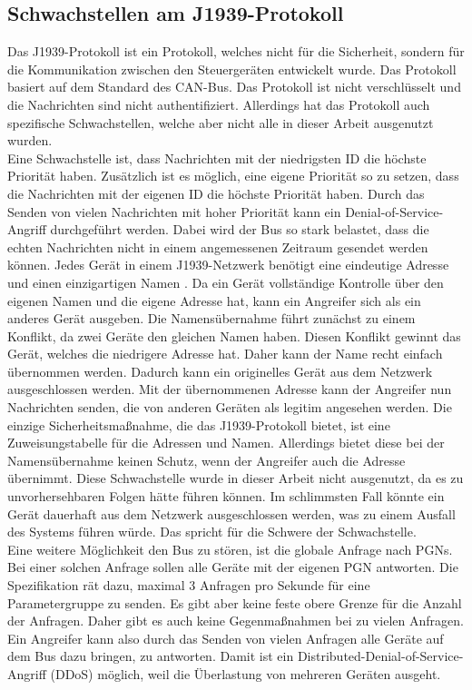 \subsection{Schwachstellen am J1939-Protokoll}
Das J1939-Protokoll ist ein Protokoll, welches nicht für die Sicherheit, sondern für die Kommunikation zwischen den Steuergeräten
entwickelt wurde. Das Protokoll basiert auf dem Standard des CAN-Bus. Das Protokoll ist nicht verschlüsselt und die Nachrichten
sind nicht authentifiziert. 
Allerdings hat das Protokoll auch spezifische Schwachstellen, welche aber nicht alle in dieser Arbeit ausgenutzt wurden.\\
Eine Schwachstelle ist, dass Nachrichten mit der niedrigsten ID die höchste Priorität haben. Zusätzlich ist es möglich, 
eine eigene Priorität so zu setzen, dass die Nachrichten mit der eigenen ID die höchste Priorität haben. Durch das Senden von
vielen Nachrichten mit hoher Priorität kann ein Denial-of-Service-Angriff durchgeführt werden. Dabei wird der Bus so stark belastet,
dass die echten Nachrichten nicht in einem angemessenen Zeitraum gesendet werden können. Jedes Gerät in einem J1939-Netzwerk
benötigt eine eindeutige Adresse und einen einzigartigen Namen \cite{JungerJ1939}. Da ein Gerät vollständige Kontrolle über 
den eigenen Namen und die eigene Adresse hat, kann ein Angreifer sich als ein anderes Gerät ausgeben. Die Namensübernahme führt
zunächst zu einem Konflikt, da zwei Geräte den gleichen Namen haben. Diesen Konflikt gewinnt das Gerät, welches die niedrigere
Adresse hat. Daher kann der Name recht einfach übernommen werden. Dadurch kann ein originelles Gerät aus dem Netzwerk ausgeschlossen
werden. Mit der übernommenen Adresse kann der Angreifer nun Nachrichten senden, die von anderen Geräten als legitim angesehen werden.
Die einzige Sicherheitsmaßnahme, die das J1939-Protokoll bietet, ist eine Zuweisungstabelle für die Adressen und Namen. Allerdings
bietet diese bei der Namensübernahme keinen Schutz, wenn der Angreifer auch die Adresse übernimmt. Diese Schwachstelle 
wurde in dieser Arbeit nicht ausgenutzt, da es zu unvorhersehbaren Folgen hätte führen können. 
Im schlimmsten Fall könnte ein Gerät dauerhaft aus dem Netzwerk ausgeschlossen werden, was zu einem Ausfall des Systems führen würde.
Das spricht für die Schwere der Schwachstelle.\\
Eine weitere Möglichkeit den Bus zu stören, ist die globale Anfrage nach PGNs. Bei einer solchen Anfrage sollen alle Geräte
mit der eigenen PGN antworten. Die Spezifikation rät dazu, maximal 3 Anfragen pro Sekunde für eine Parametergruppe zu senden.
Es gibt aber keine feste obere Grenze für die Anzahl der Anfragen. Daher gibt es auch keine Gegenmaßnahmen bei zu vielen 
Anfragen. Ein Angreifer kann also durch das Senden von vielen Anfragen alle Geräte auf dem Bus dazu bringen, zu antworten.
Damit ist ein Distributed-Denial-of-Service-Angriff (DDoS) möglich, weil die Überlastung von mehreren Geräten ausgeht. \\
\cite{Murvay2018}

